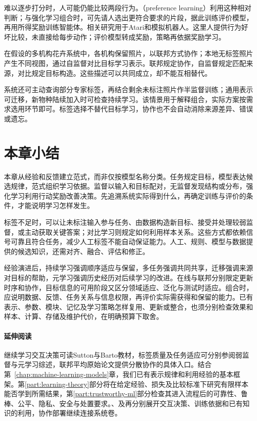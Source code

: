 难以逐步打分时，人可能仍能比较两段行为。（preference learning）利用这种相对判断；与强化学习组合时，可先请人选出更符合要求的片段，据此训练评价模型，再用所得奖励训练智能体。相关研究用于Atari和模拟机器人。这里人提供行为好坏比较，未直接给每步动作；评价模型转成奖励，策略再依据奖励学习。

在假设的多机构花卉系统中，各机构保留照片，以联邦方式协作；本地无标签照片产生不同视图，通过自监督对比目标学习表示。联邦规定协作，自监督规定匹配来源，对比规定目标构造。这些描述可以共同成立，却不能互相替代。

系统还可主动查询部分专家标签，再结合剩余未标注照片作半监督训练；通用表示可迁移，新物种陆续加入时可检查持续学习。该情景用于解释组合，实际方案按需求选用环节即可。标签选择不替代目标学习，协作也不会自动消除来源差异、错误或遗忘。

\section{本章小结}
\label{sec:machine-learning-paradigms-summary}

本章从经验和反馈建立范式，而非仅按模型名称分类。任务规定目标，模型表达候选规律，范式组织学习依据。监督以输入和目标配对，无监督发现结构或分布，强化学习利用行动奖励改善决策。先追溯系统实际得到什么，再确定训练与评价的条件，才能说明学习怎样发生。

标签不足时，可以让未标注输入参与任务、由数据构造新目标、接受并处理较弱监督，或主动获取关键答案；对比学习则规定如何利用样本关系。这些方式都依赖信号可靠且符合任务，减少人工标签不能自动保证能力。人工、规则、模型与数据提供的候选知识，还需对齐、融合、评估和修正。

经验演进后，持续学习强调顺序适应与保留，多任务强调共同共享，迁移强调来源对目标的帮助，元学习强调历史经历对后续学习的改进。在线与联邦分别限定更新时序和协作，目标信息的可用阶段又区分领域适应、泛化与测试时适应。组合时，应说明数据、反馈、任务关系与信息权限，再评价实际需获得和保留的能力。已有表示、参数、模块、记忆及学习策略怎样复用、更新或整合，也须分别检查效果和样本、计算、存储及维护代价，在明确预算下取舍。

\paragraph{延伸阅读}

继续学习交互决策可读Sutton与Barto教材，标签质量及任务适应可分别参阅弱监督与元学习综述，联邦平均原始论文提供分散协作的具体入口。结合第~\ref{chap:machine-learning-models}章，我们已有表示规律和利用经验的基本框架。第\ref{part:learning-theory}部分将在给定经验、损失及比较标准下研究有限样本能否学到所需结果，第\ref{part:trustworthy-ml}部分检查其进入流程后的可靠性、鲁棒、公平、隐私、安全与处置要求。、及再分别展开交互决策、训练依据和已有知识的利用，协作部署继续连接系统卷。
